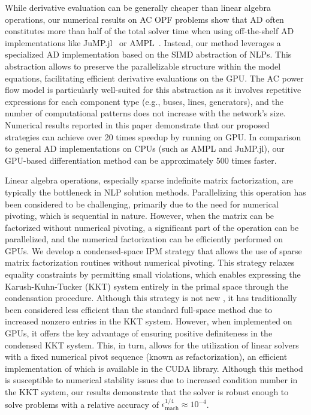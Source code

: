 While derivative evaluation can be generally cheaper than linear
algebra operations, our numerical results on AC OPF problems show that
AD often constitutes more than half of the total solver time when
using off-the-shelf AD implementations like
JuMP.jl~\cite{dunning2017jump} or
AMPL~\cite{fourer1990modeling}. Instead, our method leverages a
specialized AD implementation based on the SIMD abstraction of
NLPs. This abstraction allows to preserve the parallelizable structure
within the model equations, facilitating efficient derivative
evaluations on the GPU. The AC power flow model is particularly
well-suited for this abstraction as it involves repetitive expressions
for each component type (e.g., buses, lines, generators), and the
number of computational patterns does not increase with the network's
size. Numerical results reported in this paper demonstrate that our
proposed strategies can achieve over 20 times speedup by running on
GPU. In comparison to general AD implementations on CPUs (such as AMPL
and JuMP.jl), our GPU-based differentiation method can be
approximately 500 times faster.

Linear algebra operations, especially sparse indefinite matrix
factorization, are typically the bottleneck in NLP solution methods.
Parallelizing this operation has been considered to be challenging,
primarily due to the need for numerical pivoting, which is sequential
in nature. However, when the matrix can be factorized without
numerical pivoting, a significant part of the operation can be
parallelized, and the numerical factorization can be efficiently
performed on GPUs. We develop a condensed-space IPM strategy that
allows the use of sparse matrix factorization routines without
numerical pivoting. This strategy relaxes equality constraints by
permitting small violations, which enables expressing the
Karush-Kuhn-Tucker (KKT) system entirely in the primal space through
the condensation procedure. Although this strategy is not new
\cite{nocedal2006numerical}, it has traditionally been considered less
efficient than the standard full-space method due to increased nonzero
entries in the KKT system. However, when implemented on GPUs, it
offers the key advantage of ensuring positive definiteness in the
condensed KKT system. This, in turn, allows for the utilization
of linear solvers with a fixed numerical pivot sequence (known as
refactorization), an efficient implementation of which is available in the CUDA library.
Although this method is susceptible to numerical stability issues due to
increased condition number in the KKT system, our results demonstrate
that the solver is robust enough to solve problems with a relative
accuracy of $\epsilon_{\text{mach}}^{1/4}\approx 10^{-4}$.

